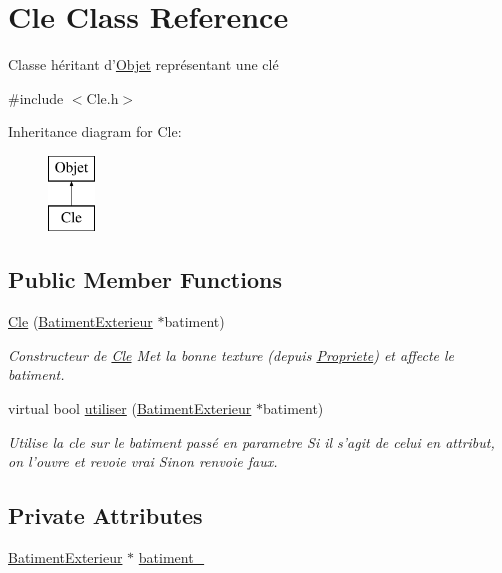 \hypertarget{classCle}{\section{Cle Class Reference}
\label{classCle}
}


Classe héritant d'\hyperlink{classObjet}{Objet} représentant une clé  




{\ttfamily \#include $<$Cle.\-h$>$}

Inheritance diagram for Cle\-:\begin{figure}[H]
\begin{center}
\leavevmode
\includegraphics[height=2.000000cm]{classCle}
\end{center}
\end{figure}
\subsection*{Public Member Functions}
\begin{DoxyCompactItemize}
\item 
\hyperlink{classCle_af3865a7ba070bbfab5b779bf518ffbdf}{Cle} (\hyperlink{classBatimentExterieur}{Batiment\-Exterieur} $\ast$batiment)
\begin{DoxyCompactList}\small\item\em Constructeur de \hyperlink{classCle}{Cle} Met la bonne texture (depuis \hyperlink{namespacePropriete}{Propriete}) et affecte le batiment. \end{DoxyCompactList}\item 
virtual bool \hyperlink{classCle_a2c22a2ae0b937736aebddd5d504a5e72}{utiliser} (\hyperlink{classBatimentExterieur}{Batiment\-Exterieur} $\ast$batiment)
\begin{DoxyCompactList}\small\item\em Utilise la cle sur le batiment passé en parametre Si il s'agit de celui en attribut, on l'ouvre et revoie vrai Sinon renvoie faux. \end{DoxyCompactList}\end{DoxyCompactItemize}
\subsection*{Private Attributes}
\begin{DoxyCompactItemize}
\item 
\hyperlink{classBatimentExterieur}{Batiment\-Exterieur} $\ast$ \hyperlink{classCle_ae612acad66ff96e67edad910c03c1354}{batiment\-\_\-}
\end{DoxyCompactItemize}
